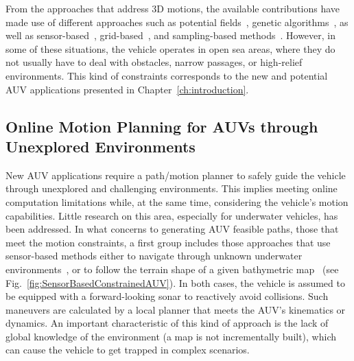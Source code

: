 From the approaches that address \ac{3D} motions, the available contributions
have made use of different approaches such as potential
fields~\cite{Warren1990,Sequeira1994}, genetic
algorithms~\cite{Sugihara1997,Alvarez2004,Hong-jian2004}, as well as
sensor-based~\cite{Ying2000,Houts2012},
grid-based~\cite{Carroll1992,Sequeira1994,Kim2012a}, and sampling-based
methods~\cite{Caldwell2010,Poppinga2011,McMahon2016}. However, in some of these
situations, the vehicle operates in open sea areas, where they do not usually
have to deal with obstacles, narrow passages, or high-relief environments. This
kind of constraints corresponds to the new and potential \ac{AUV} applications
presented in Chapter~\ref{ch:introduction}.


\subsection{Online Motion Planning for AUVs through Unexplored Environments}

New \ac{AUV} applications require a path/motion planner to safely guide the
vehicle through unexplored and challenging environments. This implies meeting
online computation limitations while, at the same time, considering the
vehicle's motion capabilities. Little research on this area, especially for
underwater vehicles, has been addressed. In what concerns to generating \ac{AUV}
feasible paths, \ie those that meet the motion constraints, a first group
includes those approaches that use sensor-based methods either to navigate
through unknown underwater environments~\cite{Ying2000}, or to follow the
terrain shape of a given bathymetric map~\cite{Houts2012} (see
Fig.~\ref{fig:SensorBasedConstrainedAUV}). In both cases, the vehicle is assumed
to be equipped with a forward-looking sonar to reactively avoid collisions. Such
maneuvers are calculated by a local planner that meets the \ac{AUV}'s kinematics
or dynamics. An important characteristic of this kind of approach is the lack of
global knowledge of the environment (\ie a map is not incrementally built),
which can cause the vehicle to get trapped in complex scenarios.

